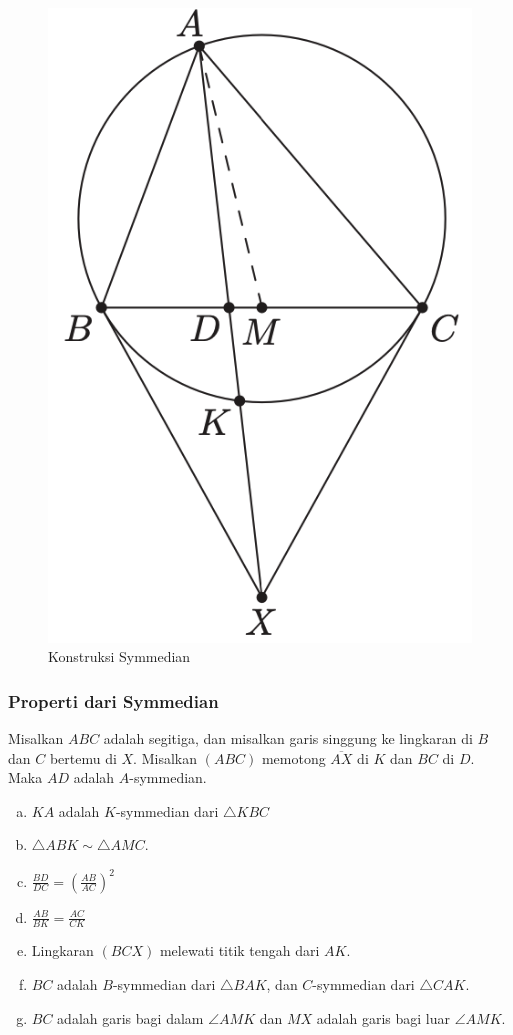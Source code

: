 \documentclass[11pt]{scrartcl}
\begin{document}
\begin{figure}[h]
    \centering
    \includegraphics[scale=0.4]{Geometri/Symmedian-NinePoint/config_symmedian.png}
    \caption{Konstruksi Symmedian}
    \label{fig:symmedian-construction}
\end{figure}

\subsubsection{Properti dari Symmedian}
Misalkan $ ABC $ adalah segitiga, dan misalkan garis singgung ke lingkaran di $ B $ dan $ C $ bertemu di $ X $. Misalkan $ (ABC) $ memotong $ \overline{AX} $ di $ K $ dan $ BC $ di $ D $. Maka $ AD $ adalah $ A $-symmedian.
\begin{enumerate}[(a)]
\item $ KA$ adalah $K$-symmedian dari $ \triangle KBC $
\item $ \triangle ABK \sim \triangle AMC $.
\item
$ \frac{BD}{DC} = \left(\frac{AB}{AC}\right)^2 $
\item
$ \frac{AB}{BK} = \frac{AC}{CK} $
\item Lingkaran $ (BCX) $ melewati titik tengah dari $ AK $.
\item $ BC $ adalah $B$-symmedian dari $\triangle BAK$, dan $C$-symmedian dari $\triangle CAK$.
\item $BC$ adalah garis bagi dalam $\angle AMK$ dan $MX $ adalah garis bagi luar $\angle AMK$.
\end{enumerate}
\end{document}
